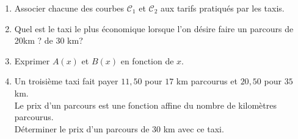 \documentclass[12pt,a4paper]{article}
\begin{document}
\begin{enumerate}
    \item Associer chacune des courbes $\mathscr{C}_{1}$ et $\mathscr{C}_{2}$ aux tarifs pratiqués par les taxis.
    \item Quel est le taxi le plus économique lorsque l'on désire faire un parcours de 20km ? de 30 km?
    \item Exprimer $A(x)$ et $B(x)$ en fonction de $x$.
    \item Un troisième taxi fait payer $11,50$\EUR{} pour $17$ km parcourus et $20,50$\EUR{} pour $35$ km.\\ Le prix d'un parcours est une fonction affine du nombre de kilomètres parcourus. \\ Déterminer le prix d'un parcours de $30 $ km avec ce taxi.
\end{enumerate}
\end{document}
